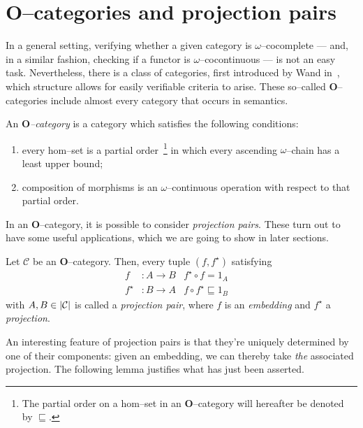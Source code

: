 \section{\(\mathbf{O}\)--categories and projection pairs}

In a general setting, verifying whether a given category is \(\omega\)--cocomplete --- and, in a similar fashion, checking if a functor is \(\omega\)--cocontinuous --- is not an easy task. %
Nevertheless, there is a class of categories, first introduced by Wand in~\cite{Wand1979}, which structure allows for easily verifiable criteria to arise.
These so--called \(\mathbf{O}\)--categories include almost every category that occurs in semantics.%
%

\begin{dfn}
  An \emph{\(\mathbf{O}\)--category} is a category which satisfies the following conditions:
  \begin{enumerate}
    \item every hom--set is a partial order~\footnote{The partial order on a hom--set in an \(\mathbf{O}\)--category will hereafter be denoted by \(\sqsubseteq{}\).} in which every ascending %
    \(\omega\)--chain has a least upper bound; %
    \item composition of morphisms is an \(\omega\)--continuous operation with respect to that partial order.%
  \end{enumerate}
\end{dfn}

In an \(\mathbf{O}\)--category, it is possible to consider \emph{projection pairs}. These turn out to have some useful applications, which we are going to show in later sections.

\begin{dfn}
  Let \(\mathcal{C}\) be an \(\mathbf{O}\)--category. Then, every tuple \((f,f^\star)\) satisfying
  \begin{align}
    f &\colon A \to B & f^\star \circ f = 1_A \quad  \\
    f^\star &\colon B \to A & f \circ f^\star \sqsubseteq 1_B \quad
  \end{align}
  with \(A,B \in \lvert \mathcal{C} \rvert\) is called a \emph{projection pair}, where \(f\) is an \emph{embedding} and \(f^\star\) a \emph{projection}.%
\end{dfn}

An interesting feature of projection pairs is that they're uniquely determined by one of their components: given an embedding, we can thereby take \emph{the} associated projection.
The following lemma justifies what has just been asserted.

